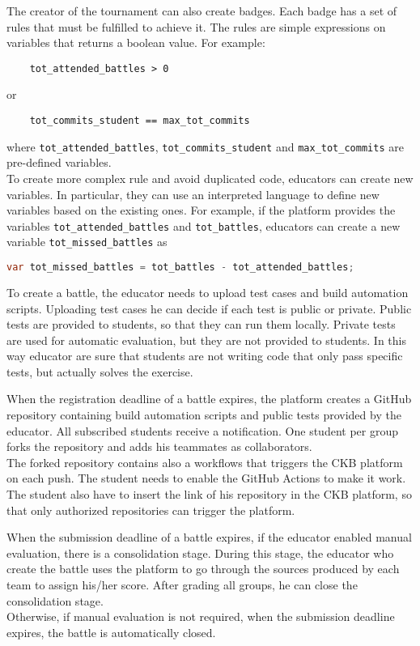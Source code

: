 The creator of the tournament can also create badges.
Each badge has a set of rules that must be fulfilled to achieve it.
The rules are simple expressions on variables that returns a boolean value.
For example: 
\begin{lstlisting}
    tot_attended_battles > 0
\end{lstlisting}
or 
\begin{lstlisting}
    tot_commits_student == max_tot_commits
\end{lstlisting}
where \lstinline{tot_attended_battles}, \lstinline{tot_commits_student} and \lstinline{max_tot_commits} are pre-defined variables.\\
To create more complex rule and avoid duplicated code, educators can create new variables.
In particular, they can use an interpreted language to define new variables based on the existing ones.
For example, if the platform provides the variables \lstinline{tot_attended_battles} and \lstinline{tot_battles}, 
educators can create a new variable \lstinline{tot_missed_battles} as
\begin{lstlisting}[language=java, morekeywords={var}, keywordstyle=\color{blue}]
    var tot_missed_battles = tot_battles - tot_attended_battles;
\end{lstlisting}

To create a battle, the educator needs to upload test cases and build automation scripts.
Uploading test cases he can decide if each test is public or private.
Public tests are provided to students, so that they can run them locally.
Private tests are used for automatic evaluation, but they are not provided to students.
In this way educator are sure that students are not writing code that only pass specific tests, but actually solves the exercise.

When the registration deadline of a battle expires, the platform creates a GitHub repository containing build automation scripts and public tests provided by the educator.
All subscribed students receive a notification.
One student per group forks the repository and adds his teammates as collaborators.\\
The forked repository contains also a workflows that triggers the CKB platform on each push.
The student needs to enable the GitHub Actions to make it work.
The student also have to insert the link of his repository in the CKB platform, so that only authorized repositories can trigger the platform.

When the submission deadline of a battle expires, if the educator enabled manual evaluation, there is a consolidation stage.
During this stage, the educator who create the battle uses the platform to go through the sources produced by each team to assign his/her score.
After grading all groups, he can close the consolidation stage.\\
Otherwise, if manual evaluation is not required, when the submission deadline expires, the battle is automatically closed.

